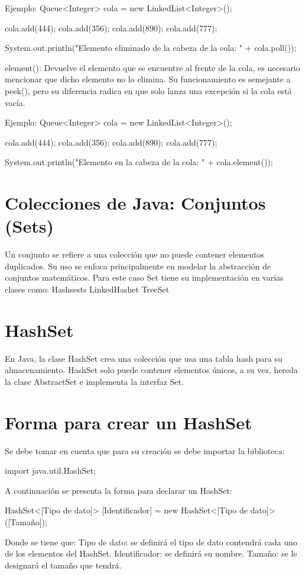 \documentclass[12pt, letterpaper]{article} %
\begin{document}
Ejemplo:
Queue<Integer> cola = new LinkedList<Integer>();

cola.add(444);
cola.add(356);
cola.add(890);
cola.add(777);

System.out.println("Elemento eliminado de la cabeza de la cola: " + cola.poll());


element():
Devuelve el elemento que se encuentre al frente de la cola, es necesario mencionar que dicho elemento no lo elimina. Su funcionamiento es semejante a peek(), pero su diferencia radica en que solo lanza una excepción si la cola está vacía.

Ejemplo:
Queue<Integer> cola = new LinkedList<Integer>();

cola.add(444);
cola.add(356);
cola.add(890);
cola.add(777);

System.out.println("Elemento en la cabeza de la cola: " + cola.element());


\section{Colecciones de Java: Conjuntos (Sets)}
Un conjunto se refiere a una colección que no puede contener elementos duplicados. Su uso se enfoca principalmente en modelar la abstracción de conjuntos matemáticos. Para este caso Set tiene su implementación en varias clases como:
Hashsests
LinkedHashet
TreeSet

\section*{HashSet}
En Java, la clase HashSet crea una colección que usa una tabla hash para su almacenamiento. HashSet solo puede contener elementos únicos, a su vez, hereda la clase AbstractSet e implementa la interfaz Set.

\section*{Forma para crear un HashSet}
Se debe tomar en cuenta que para su creación se debe importar la biblioteca:

import java.util.HashSet;

A continuación se presenta la forma para declarar un HashSet:

HashSet<[Tipo de dato]> [Identificador] = new HashSet<[Tipo de dato]>([Tamaño]);

Donde se tiene que:
Tipo de dato: se definirá el tipo de dato contendrá cada uno de los elementos del HashSet.
Identificador: se definirá su nombre.
Tamaño: se le designará el tamaño que tendrá.
\end{document}
